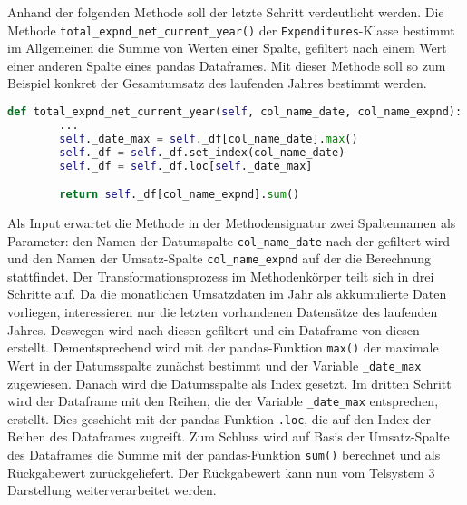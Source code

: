     

    Anhand der folgenden Methode soll der letzte Schritt verdeutlicht werden.
    Die Methode \texttt{total\_expnd\_net\_current\_year()} der \texttt{Expenditures}-Klasse bestimmt im Allgemeinen die Summe von Werten einer Spalte, gefiltert
    nach einem Wert einer anderen Spalte eines pandas Dataframes. Mit dieser Methode soll so zum Beispiel konkret der Gesamtumsatz des 
    laufenden Jahres bestimmt werden.

    \begin{lstlisting}[language=Python, caption=Beispiel Methode Exenditures class]
    def total_expnd_net_current_year(self, col_name_date, col_name_expnd):
        ... 
        self._date_max = self._df[col_name_date].max()
        self._df = self._df.set_index(col_name_date)
        self._df = self._df.loc[self._date_max]

        return self._df[col_name_expnd].sum()  
    \end{lstlisting}

    Als Input erwartet die Methode in der Methodensignatur zwei Spaltennamen als Parameter: den Namen der Datumspalte \texttt{col\_name\_date} nach der gefiltert wird
    und den Namen der Umsatz-Spalte  \texttt{col\_name\_expnd} auf der die Berechnung stattfindet. Der Transformationsprozess im Methodenkörper teilt sich in drei Schritte auf. Da die monatlichen Umsatzdaten im Jahr als 
    akkumulierte Daten vorliegen, interessieren nur die letzten vorhandenen Datensätze des laufenden Jahres. Deswegen
    wird nach diesen gefiltert und ein Dataframe von diesen erstellt. Dementsprechend wird mit der pandas-Funktion \texttt{max()} 
    der maximale Wert in der Datumsspalte zunächst bestimmt und der Variable \texttt{\_date\_max} zugewiesen. Danach wird die Datumsspalte als Index gesetzt. 
    Im dritten Schritt wird der Dataframe mit den Reihen, die der Variable \texttt{\_date\_max} entsprechen, erstellt. Dies geschieht mit der pandas-Funktion \texttt{.loc}, die
    auf den Index der Reihen des Dataframes zugreift. Zum Schluss wird auf Basis der Umsatz-Spalte des Dataframes die Summe mit der pandas-Funktion \texttt{sum()} berechnet 
    und als Rückgabewert zurückgeliefert. Der Rückgabewert kann nun vom Telsystem 3 Darstellung weiterverarbeitet werden.\\

